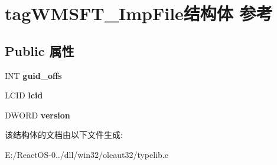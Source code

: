 \hypertarget{structtag_w_m_s_f_t___imp_file}{}\section{tag\+W\+M\+S\+F\+T\+\_\+\+Imp\+File结构体 参考}
\label{structtag_w_m_s_f_t___imp_file}
\subsection*{Public 属性}
\begin{DoxyCompactItemize}
\item 
\mbox{\label{structtag_w_m_s_f_t___imp_file_adf74bfe407e9aed23d9b4117c1b2f7b0}} 
I\+NT {\bfseries guid\+\_\+offs}
\item 
\mbox{\label{structtag_w_m_s_f_t___imp_file_a93c10cc2469ec14cc389c1758be02ab4}} 
L\+C\+ID {\bfseries lcid}
\item 
\mbox{\label{structtag_w_m_s_f_t___imp_file_ab2fd556b3cd5602568310557fba3b9d2}} 
D\+W\+O\+RD {\bfseries version}
\end{DoxyCompactItemize}


该结构体的文档由以下文件生成\+:\begin{DoxyCompactItemize}
\item 
E\+:/\+React\+O\+S-\/0../dll/win32/oleaut32/typelib.\+c\end{DoxyCompactItemize}
